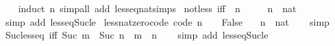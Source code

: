 \begin{isabellebody}
%
\isadelimproof
\ \ %
\endisadelimproof
%
\isatagproof
{}\isamarkupfalse%
\ {\isacharparenleft}{\kern0pt}induct\ n{\isacharparenright}{\kern0pt}\ {\isacharparenleft}{\kern0pt}simp{\isacharunderscore}{\kern0pt}all\ add{\isacharcolon}{\kern0pt}\ less{\isacharunderscore}{\kern0pt}eq{\isacharunderscore}{\kern0pt}nat{\isachardot}{\kern0pt}simps{\isacharparenleft}{\kern0pt}{}{\isacharparenright}{\kern0pt}{\isacharparenright}{\kern0pt}%
\endisatagproof
{\isafoldproof}%
%
\isadelimproof
\isanewline
%
\endisadelimproof
\isanewline
{}\isamarkupfalse%
\ not{\isacharunderscore}{\kern0pt}less{}\ {\isacharbrackleft}{\kern0pt}iff{\isacharbrackright}{\kern0pt}{\isacharcolon}{\kern0pt}\ {\isachardoublequoteopen}{\isasymnot}\ n\ {\isacharless}{\kern0pt}\ {}{\isachardoublequoteclose}\isanewline
\ \ \ n\ {\isacharcolon}{\kern0pt}{\isacharcolon}{\kern0pt}\ nat\isanewline
%
\isadelimproof
\ \ %
\endisadelimproof
%
\isatagproof
{}\isamarkupfalse%
\ {\isacharparenleft}{\kern0pt}simp\ add{\isacharcolon}{\kern0pt}\ less{\isacharunderscore}{\kern0pt}eq{\isacharunderscore}{\kern0pt}Suc{\isacharunderscore}{\kern0pt}le{\isacharparenright}{\kern0pt}%
\endisatagproof
{\isafoldproof}%
%
\isadelimproof
\isanewline
%
\endisadelimproof
\isanewline
{}\isamarkupfalse%
\ less{\isacharunderscore}{\kern0pt}nat{\isacharunderscore}{\kern0pt}zero{\isacharunderscore}{\kern0pt}code\ {\isacharbrackleft}{\kern0pt}code{\isacharbrackright}{\kern0pt}{\isacharcolon}{\kern0pt}\ {\isachardoublequoteopen}n\ {\isacharless}{\kern0pt}\ {}\ {\isasymlongleftrightarrow}\ False{\isachardoublequoteclose}\isanewline
\ \ \ n\ {\isacharcolon}{\kern0pt}{\isacharcolon}{\kern0pt}\ nat\isanewline
%
\isadelimproof
\ \ %
\endisadelimproof
%
\isatagproof
{}\isamarkupfalse%
\ simp%
\endisatagproof
{\isafoldproof}%
%
\isadelimproof
\isanewline
%
\endisadelimproof
\isanewline
{}\isamarkupfalse%
\ Suc{\isacharunderscore}{\kern0pt}less{\isacharunderscore}{\kern0pt}eq\ {\isacharbrackleft}{\kern0pt}iff{\isacharbrackright}{\kern0pt}{\isacharcolon}{\kern0pt}\ {\isachardoublequoteopen}Suc\ m\ {\isacharless}{\kern0pt}\ Suc\ n\ {\isasymlongleftrightarrow}\ m\ {\isacharless}{\kern0pt}\ n{\isachardoublequoteclose}\isanewline
%
\isadelimproof
\ \ %
\endisadelimproof
%
\isatagproof
{}\isamarkupfalse%
\ {\isacharparenleft}{\kern0pt}simp\ add{\isacharcolon}{\kern0pt}\ less{\isacharunderscore}{\kern0pt}eq{\isacharunderscore}{\kern0pt}Suc{\isacharunderscore}{\kern0pt}le{\isacharparenright}{\kern0pt}%

\end{isabellebody}
